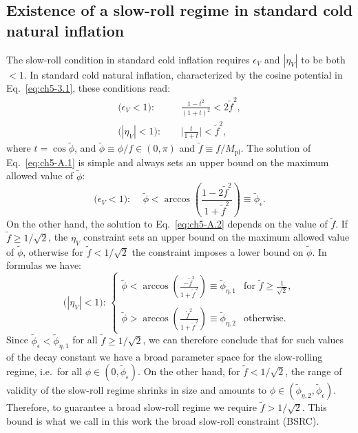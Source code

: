 \begin{subappendices}

\section{Existence of a slow-roll regime in standard cold natural inflation \label{app:ch5-A}}

The slow-roll condition in standard cold inflation requires $\epsilon_V$ and $|\eta_V|$ to be both $<1$. In standard cold natural inflation, characterized by the cosine potential in Eq.~\ref{eq:ch5-3.1}, these conditions read:
\begin{align}
\text{($\epsilon_{V}<1$): }& \quad  \frac{1-t^2}{(1+t)^{2}}<2\tilde{f}^2, \label{eq:ch5-A.1} \\
\text{($|\eta_{V}|<1$): }& \quad \Big|\frac{t}{1+t}\Big|<\tilde{f}^2, \label{eq:ch5-A.2}
\end{align}
where $t=\cos\tilde{\phi}$, and $\tilde{\phi}\equiv \phi/f\in(0,\pi)$ and $\tilde{f}\equiv f/M_{\mathrm{pl}}$. The solution of Eq.~\ref{eq:ch5-A.1} is simple and always sets an upper bound on the maximum allowed value of $\tilde{\phi}$:
\begin{equation}
 \text{($\epsilon_{V}<1$): } \quad   \tilde{\phi}<\arccos{\left(\frac{1-2\tilde{f}^2}{1+\tilde{f}^2}\right)}\equiv \tilde{\phi}_\epsilon.
\end{equation}
On the other hand, the solution to Eq.~\ref{eq:ch5-A.2} depends on the value of $\tilde{f}$. If $\tilde{f}\geq 1/\sqrt{2}$, the $\eta_V$ constraint sets an upper bound on the maximum allowed value of $\tilde{\phi}$, otherwise for $\tilde{f}< 1/\sqrt{2}$ the constraint imposes a lower bound on $\tilde{\phi}$. In formulas we have:
\begin{equation}
    \text{($|\eta_{V}|<1$): } \begin{cases}
  \tilde{\phi}<\arccos{\left(\frac{-\tilde{f}^2}{1+\tilde{f}^2}\right)}\equiv \tilde{\phi}_{\eta,1} & \text{for } \tilde{f}\geq\frac{1}{\sqrt{2}}, \\
  \\
  \tilde{\phi}>\arccos{\left(\frac{\tilde{f}^2}{1+\tilde{f}^2}\right)}\equiv \tilde{\phi}_{\eta,2} & \text{otherwise.}
\end{cases}
\end{equation}
Since $\tilde{\phi}_\epsilon<\tilde{\phi}_{\eta,1}$ for all $\tilde{f}\geq 1/\sqrt{2}$, we can therefore conclude that for such values of the decay constant we have a broad parameter space for the slow-rolling regime, i.e.\ for all $\phi\in(0,\tilde{\phi}_\epsilon)$. On the other hand, for $\tilde{f}<1/\sqrt{2}$, the range of validity of the slow-roll regime shrinks in size and amounts to $\phi\in(\tilde{\phi}_{\eta,2},\tilde{\phi}_\epsilon)$. Therefore, to guarantee a broad slow-roll regime we require $\tilde{f}>1/\sqrt{2}$. This bound is what we call in this work the broad slow-roll constraint (BSRC).


\end{subappendices}
